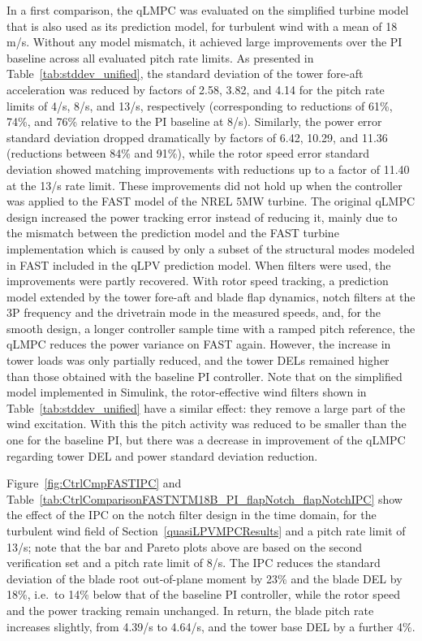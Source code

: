 In a first comparison, the qLMPC was evaluated on the simplified turbine model that is also
used as its prediction model, for turbulent wind with a mean of 18\,m/s. Without any model
mismatch, it achieved large improvements over the PI baseline across all evaluated pitch rate limits.
As presented in Table~\ref{tab:stddev_unified}, the standard deviation of the tower fore-aft acceleration was reduced
by factors of 2.58, 3.82, and 4.14 for the pitch rate limits of 4\textdegree/s, 8\textdegree/s, and
13\textdegree/s, respectively (corresponding to reductions of 61\%, 74\%, and 76\% relative to the
PI baseline at 8\textdegree/s). Similarly, the power error standard deviation dropped dramatically
by factors of 6.42, 10.29, and 11.36 (reductions between 84\% and 91\%), while the rotor speed error
standard deviation showed matching improvements with reductions up to a factor of 11.40 at the
13\textdegree/s rate limit. These improvements did not hold up when the controller was applied to the FAST model of the NREL 5MW
turbine. The original qLMPC design increased the power tracking error instead of reducing it,
mainly due to the mismatch between the prediction model and the FAST turbine implementation which is caused by only a subset of the structural modes modeled in FAST included in the qLPV prediction model. When filters were used, the
improvements were partly recovered. With rotor speed tracking, a prediction model extended by the tower fore-aft and
blade flap dynamics, notch filters at the 3P frequency and the drivetrain mode in the measured
speeds, and, for the smooth design, a longer controller sample time with a ramped pitch
reference, the qLMPC reduces the power variance on FAST again. However, the increase in tower
loads was only partially reduced, and the tower DELs remained higher than those obtained with the baseline PI controller. Note that on the simplified model implemented in Simulink, the
rotor-effective wind filters shown in Table~\ref{tab:stddev_unified} have a similar effect: they
remove a large part of the wind excitation. With this the pitch activity was reduced to be smaller than the one for the baseline PI, but there was a decrease in improvement of the
qLMPC regarding tower DEL and power standard deviation reduction.

Figure~\ref{fig:CtrlCmpFASTIPC} and Table~\ref{tab:CtrlComparisonFASTNTM18B_PI_flapNotch_flapNotchIPC} show the effect of the IPC on the notch filter design in the time domain, for the turbulent wind field of Section~\ref{quasiLPVMPCResults} and a pitch rate limit of 13\textdegree/s; note that the bar and Pareto plots above are based on the second verification set and a pitch rate limit of 8\textdegree/s. The IPC reduces the standard deviation of the blade root out-of-plane moment by 23\% and the blade DEL by 18\%, i.e.\ to 14\% below that of the baseline PI controller, while the rotor speed and the power tracking remain unchanged. In return, the blade pitch rate increases slightly, from 4.39\textdegree/s to 4.64\textdegree/s, and the tower base DEL by a further 4\%.

